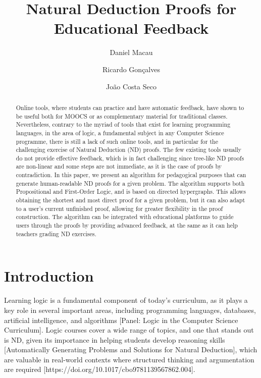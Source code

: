 \documentclass[runningheads]{llncs}
\begin{document}
\title{Natural Deduction Proofs for Educational Feedback}

\author{Daniel Macau
\and Ricardo Gonçalves
\and João Costa Seco}


\maketitle 

\begin{abstract}
Online tools, where students can practice and have automatic feedback, have shown to be useful both for MOOCS or as complementary material for traditional classes. Nevertheless, contrary to the myriad of tools that exist for learning programming languages, in the area of logic, a fundamental subject in any Computer Science programme, there is still a lack of such online tools, and in particular for the challenging exercise of Natural Deduction (ND) proofs. The few existing tools usually do not provide effective feedback, which is in fact challenging since tree-like ND proofs are non-linear and some steps are not immediate, as it is the case of proofs by contradiction. In this paper, we present an algorithm for pedagogical purposes that can generate human-readable ND proofs for a given problem. The algorithm supports both Propositional and First-Order Logic, and is based on directed hypergraphs. This allows obtaining the shortest and most direct proof for a given problem, but it can also adapt to a user’s current unfinished proof, allowing for greater flexibility in the proof construction. The algorithm can be integrated with educational platforms to guide users through the proofs by providing advanced feedback, at the same as it can help teachers grading ND exercises. 

\end{abstract}

\section{Introduction}
Learning logic is a fundamental component of today’s curriculum, as it plays a key role in several important areas, including programming languages, databases, artificial intelligence, and algorithms [Panel: Logic in the Computer Science Curriculum]. Logic courses cover a wide range of topics, and one that stands out is ND, given its importance in helping students develop reasoning skills [Automatically Generating Problems and Solutions for Natural Deduction], which are valuable in real-world contexts where structured thinking and argumentation are required [https://doi.org/10.1017/cbo9781139567862.004].
\end{document}
